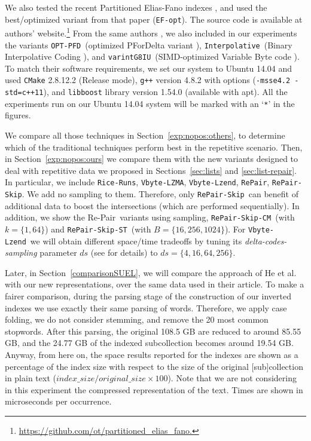\documentclass[review]{elsarticle}
\newcommand{\repair}{Re-Pair}
\newcommand{\riceRuns}{\texttt{Rice-Runs}}
\newcommand{\repairNo}{\texttt{RePair}}
\newcommand{\repairSkip}{\texttt{RePair-Skip}}
\newcommand{\repairSkipCM}{\texttt{RePair-Skip-CM}}
\newcommand{\repairSkipST}{\texttt{RePair-Skip-ST}}
\newcommand{\vbyteLZMA}{\texttt{Vbyte-LZMA}}
\newcommand{\vbyteLzend}{\texttt{Vbyte-Lzend}}
\newcommand{\interpolative}{\texttt{Interpolative}}
\newcommand{\efopt}{\texttt{EF-opt}}
\newcommand{\optpfd}{\texttt{OPT-PFD}}
\newcommand{\varint}{\texttt{varintG8IU}}
\begin{document}
We also tested the recent Partitioned Elias-Fano indexes \cite{OV14}, and used the best/optimized variant from that paper (\efopt). The source code is available at authors' website.\footnote{\url{https://github.com/ot/partitioned_elias_fano.}}
From  the same authors \cite{OV14}, we also included in our experiments the variants \optpfd\ (optimized PForDelta variant \cite{YDS09}), \interpolative\ (Binary Interpolative Coding \cite{MS00}), and \varint\ (SIMD-optimized Variable Byte code \cite{Stepanov:2011}). To match their software requirements, we set our system to Ubuntu 14.04 and used \texttt{CMake} 2.8.12.2 (Release mode), \texttt{g++} version 4.8.2 with options (\texttt{-msse4.2 -std=c++11}), and {\tt libboost} library version 1.54.0 (available with apt). All the experiments run on our Ubuntu 14.04 system will be marked with an `\texttt{*}' in the figures. 



We compare all those techniques in Section~\ref{exp:nopos:others}, to determine which of the traditional techniques perform best in the repetitive scenario. 
Then, in Section~\ref{exp:nopos:ours} we compare them with the new variants designed to deal with repetitive data we proposed in Sections~\ref{sec:lists} and \ref{sec:list-repair}. In particular, we include \riceRuns,
\vbyteLZMA,  \vbyteLzend, \repairNo, \repairSkip. We add no sampling to them. Therefore, only \repairSkip\ can benefit of additional data to boost the intersections (which are performed sequentially). In addition, we show the \repair\ variants using sampling, \repairSkipCM\ (with $k=\{1,64\}$) and \repairSkipST\ (with $B=\{16, 256, 1024\}$). For \vbyteLzend\ we will obtain different space/time tradeoffs by tuning its {\em delta-codes-sampling} parameter $ds$ (see \cite{KNtcs12} for details) to $ds=\{4,16,64,256\}$.

Later, in Section~\ref{comparisonSUEL}, we will compare the approach of He et al.~\cite{HZS10} with our new representations, over the same data used in their article. To make a fairer comparison, during the parsing stage of the construction of our inverted indexes we use exactly their same parsing
of words. Therefore, we apply case folding, we do not consider stemming, and remove the 20 most common stopwords. 
%
%
After this parsing, the original 108.5 GB are reduced to
around 85.55 GB, and the 24.77 GB of the indexed subcollection becomes around 19.54 GB. 
Anyway, from here on, the space results reported for the indexes are shown as a percentage 
of the index size with respect to the size of the original [sub]collection in plain text
($index\_size / original\_size \times 100$). Note that we are not considering in
this experiment the compressed representation of the text. 
Times are shown in microseconds per occurrence.
\end{document}
